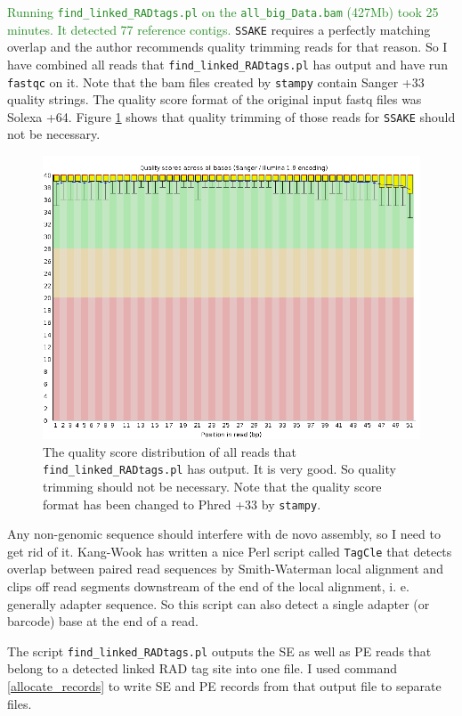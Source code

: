 \documentclass{article}\usepackage[]{graphicx}\usepackage[]{color}
\newcommand{\roger}[1]{ \textcolor[named]{ForestGreen}{#1} }
\begin{document}
\roger{Running \texttt{find\_linked\_RADtags.pl} on the \texttt{all\_big\_Data.bam} (427Mb) took 25 minutes. It detected 77 reference contigs.} \texttt{SSAKE} requires a perfectly matching overlap and the author recommends quality trimming reads for that reason. So I have combined all reads that \texttt{find\_linked\_RADtags.pl} has output and have run \texttt{fastqc} on it. Note that the bam files created by \texttt{stampy} contain Sanger +33 quality strings. The quality score format of the original input fastq files was Solexa +64. Figure \ref{per_base_quality} shows that quality trimming of those reads for \texttt{SSAKE} should not be necessary.

\begin{figure}[htb]
\centering
\includegraphics[width=.8\textwidth]{./figure/per_base_quality}
\caption{The quality score distribution of all reads that \texttt{find\_linked\_RADtags.pl} has output. It is very good. So quality trimming should not be necessary. Note that the quality score format has been changed to Phred +33 by \texttt{stampy}.}
\label{per_base_quality}
\end{figure}

Any non-genomic sequence should interfere with de novo assembly, so I need to get rid of it. Kang-Wook has written a nice Perl script called \texttt{TagCle} that detects overlap between paired read sequences by Smith-Waterman local alignment and clips off read segments downstream of the end of the local alignment, i. e. generally adapter sequence. So this script can also detect a single adapter (or barcode) base at the end of a read. 

The script \texttt{find\_linked\_RADtags.pl} outputs the SE as well as PE reads that belong to a detected linked RAD tag site into one file. I used command \ref{allocate_records} to write SE and PE records from that output file to separate files.
\end{document}
